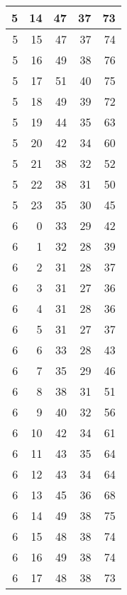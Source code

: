 \begin{longtable}{|r|r|r|r|r|}
    \hline
    5     & 14    & 47    & 37    & 73 \\
    \hline
    5     & 15    & 47    & 37    & 74 \\
    \hline
    5     & 16    & 49    & 38    & 76 \\
    \hline
    5     & 17    & 51    & 40    & 75 \\
    \hline
    5     & 18    & 49    & 39    & 72 \\
    \hline
    5     & 19    & 44    & 35    & 63 \\
    \hline
    5     & 20    & 42    & 34    & 60 \\
    \hline
    5     & 21    & 38    & 32    & 52 \\
    \hline
    5     & 22    & 38    & 31    & 50 \\
    \hline
    5     & 23    & 35    & 30    & 45 \\
    \hline
    6     & 0     & 33    & 29    & 42 \\
    \hline
    6     & 1     & 32    & 28    & 39 \\
    \hline
    6     & 2     & 31    & 28    & 37 \\
    \hline
    6     & 3     & 31    & 27    & 36 \\
    \hline
    6     & 4     & 31    & 28    & 36 \\
    \hline
    6     & 5     & 31    & 27    & 37 \\
    \hline
    6     & 6     & 33    & 28    & 43 \\
    \hline
    6     & 7     & 35    & 29    & 46 \\
    \hline
    6     & 8     & 38    & 31    & 51 \\
    \hline
    6     & 9     & 40    & 32    & 56 \\
    \hline
    6     & 10    & 42    & 34    & 61 \\
    \hline
    6     & 11    & 43    & 35    & 64 \\
    \hline
    6     & 12    & 43    & 34    & 64 \\
    \hline
    6     & 13    & 45    & 36    & 68 \\
    \hline
    6     & 14    & 49    & 38    & 75 \\
    \hline
    6     & 15    & 48    & 38    & 74 \\
    \hline
    6     & 16    & 49    & 38    & 74 \\
    \hline
    6     & 17    & 48    & 38    & 73 \\

\end{longtable}
